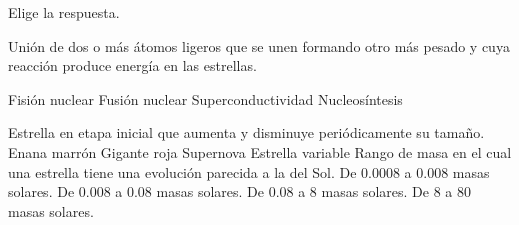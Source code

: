 Elige la respuesta.
\begin{parts}
    Unión de dos o más átomos ligeros que se unen formando otro más pesado y cuya reacción produce energía en las estrellas.

    \begin{oneparchoices}
        \choice Fisión nuclear
        \choice Fusión nuclear
        \choice Superconductividad
        \choice Nucleosíntesis
    \end{oneparchoices}
    Estrella en etapa inicial que aumenta y disminuye periódicamente su tamaño.
    Enana marrón Gigante roja Supernova Estrella variable
    Rango de masa en el cual una estrella tiene una evolución parecida a la del Sol.
    De 0.0008 a 0.008 masas solares. De 0.008 a 0.08 masas solares. De 0.08 a 8 masas solares. De 8 a 80 masas solares.
\end{parts}
